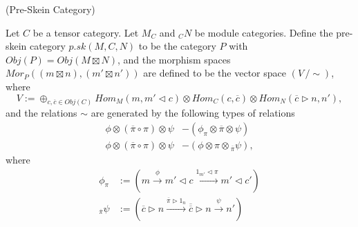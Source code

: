 \begin{definition} (Pre-Skein Category)

  \noindent Let $C$ be a tensor category. Let $M_{C}$ and $ _{C}N$ be module
  categories. \quad Define the pre-skein category $p.sk(M,C,N)$ to be the
  category $P$ with $Obj(P) = Obj(M \boxtimes N)$, and the morphism spaces
  $Mor_{P}((m \boxtimes n), (m' \boxtimes n'))$ are defined to be the vector space
  $(V \,/ \sim)$, where
  \[
    V := \oplus_{c,\overline{c} \in Obj(C)} Hom_{M}(m, m' \lhd c) \otimes Hom_{C}(c,\overline{c}) \otimes Hom_{N} (\overline{c} \rhd n, n'),
  \]
  and the relations $\sim$ are generated by the following types of relations
  \begin{align}
    \phi \otimes (\overline{\pi} \circ \pi) \otimes \psi &- (\phi_{\pi} \otimes \overline{\pi} \otimes \psi) \label{relation/a} \\
    \phi \otimes (\overline{\pi} \circ \pi) \otimes \psi &- (\phi \otimes \pi \otimes {}_{\overline{\pi}}\psi) \label{relation/b},
  \end{align}
  where
  \begin{align}
    \phi_{\pi}  &:= \left( m \xrightarrow{\phi} m' \lhd c \xrightarrow{1_{m'} \lhd \pi} m' \lhd c' \right)\\
    {}_{\overline{\pi}}\psi &:= \left( \overline{c} \rhd n \xrightarrow{\overline{\pi} \rhd 1_{n}} \overline{\overline{c}} \rhd n \xrightarrow{\psi} n' \right)
  \end{align}

  \begin{center}
    
  \end{center}


\end{definition}
